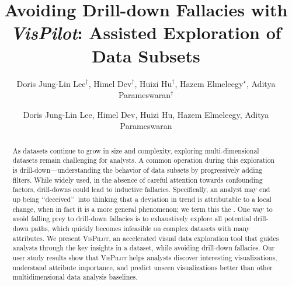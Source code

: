 \documentclass[sigchi]{acmart}
\newcommand{\system}{\textsc{VisPilot}\xspace}
\newcommand{\change}[1]{{\leavevmode\color{red}#1}}
\begin{document}
\author{Doris Jung-Lin Lee$^\dagger$, Himel Dev$^\dagger$, Huizi Hu$^\dagger$, Hazem Elmeleegy$^\star$, Aditya Parameswaran$^\dagger$}




\title{Avoiding Drill-down Fallacies with {\em VisPilot}: Assisted Exploration of Data Subsets}
\begin{abstract}
As datasets continue to grow in size and complexity,
exploring multi-dimensional datasets remain challenging for analysts.
A common operation during this exploration is drill-down---understanding
the behavior of data subsets by \change{progressively} adding filters.
While widely used, in the absence of careful attention towards confounding factors,
drill-downs could lead to inductive fallacies.
Specifically, an analyst may end up being \lq\lq deceived\rq\rq\ into thinking that a deviation in trend is attributable to a local change, when in fact \change{it is a more general phenomenon};
we term this the \change{{\em drill-down fallacy}}. \change{One way to avoid falling prey to drill-down fallacies}
is to exhaustively explore all potential drill-down paths,
which quickly becomes infeasible \change{on complex datasets with many attributes}.
We present \system, an accelerated visual data exploration tool that guides analysts \change{through the} key insights in a dataset, while avoiding drill-down fallacies. Our user study results show that \system helps analysts discover interesting visualizations, understand attribute importance, and predict unseen visualizations better than other \change{multidimensional data analysis} baselines.
\end{abstract}
\maketitle
 \author{Doris Jung-Lin Lee, Himel Dev, Huizi Hu, Hazem Elmeleegy, Aditya Parameswaran}
\end{document}
